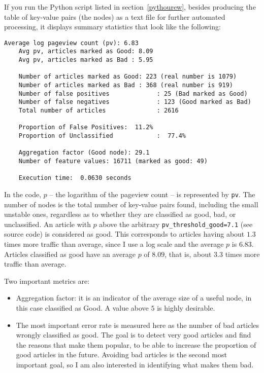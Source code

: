 \documentclass[oneside,10pt]{book}
\begin{document}
If you run the Python script listed in section~\ref{pythourew}, besides producing the table of key-value pairs (the nodes) as a text file for further automated processing, it displays summary statistics that look like the following:

\begin{lstlisting}[frame=none]
    Average log pageview count (pv): 6.83
    Avg pv, articles marked as Good: 8.09
    Avg pv, articles marked as Bad : 5.95

    Number of articles marked as Good: 223 (real number is 1079)
    Number of articles marked as Bad : 368 (real number is 919)
    Number of false positives             : 25 (Bad marked as Good)
    Number of false negatives             : 123 (Good marked as Bad)
    Total number of articles              : 2616

    Proportion of False Positives:  11.2%
    Proportion of Unclassified            :  77.4%

    Aggregation factor (Good node): 29.1
    Number of feature values: 16711 (marked as good: 49)

    Execution time:  0.0630 seconds
\end{lstlisting}

\noindent In the code, $p$ -- the logarithm of the pageview count -- is represented by  \texttt{pv}. The number of nodes is the total number of key-value pairs found, including the small unstable ones, regardless as to whether they are classified as good, bad, or unclassified. An article with $p$ above the arbitrary  \texttt{pv\_threshold\_good=7.1} (see source code) is considered as good. This corresponds to articles having about $1.3$ times more traffic than average, since I use a log scale and the average $p$ is $6.83$. Articles classified as good have an average $p$ of $8.09$, that is, about $3.3$ times more traffic than average.

\noindent Two important metrics are:
\begin{itemize}
\item Aggregation factor: it is an indicator of the average size of a useful node, in this case classified as Good. A value above $5$ is highly desirable.
\item The most important error rate is measured here as the number of bad articles wrongly classified as good. The goal is to detect very good articles and find the reasons that make  them popular, to be able to increase the proportion of good articles in the future. Avoiding bad articles is the second most important goal, so I am also interested in identifying what makes them bad.
\end{itemize}
\end{document}
